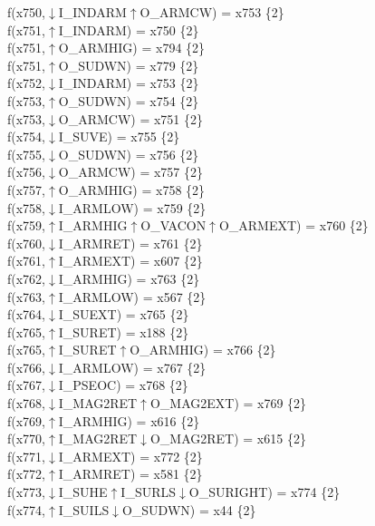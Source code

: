 f(x750,$\downarrow$I\_INDARM$\uparrow$O\_ARMCW) = x753 \{2\} \\  
f(x751,$\uparrow$I\_INDARM) = x750 \{2\} \\  
f(x751,$\uparrow$O\_ARMHIG) = x794 \{2\} \\  
f(x751,$\uparrow$O\_SUDWN) = x779 \{2\} \\  
f(x752,$\downarrow$I\_INDARM) = x753 \{2\} \\  
f(x753,$\uparrow$O\_SUDWN) = x754 \{2\} \\  
f(x753,$\downarrow$O\_ARMCW) = x751 \{2\} \\  
f(x754,$\downarrow$I\_SUVE) = x755 \{2\} \\  
f(x755,$\downarrow$O\_SUDWN) = x756 \{2\} \\  
f(x756,$\downarrow$O\_ARMCW) = x757 \{2\} \\  
f(x757,$\uparrow$O\_ARMHIG) = x758 \{2\} \\  
f(x758,$\downarrow$I\_ARMLOW) = x759 \{2\} \\  
f(x759,$\uparrow$I\_ARMHIG$\uparrow$O\_VACON$\uparrow$O\_ARMEXT) = x760 \{2\} \\  
f(x760,$\downarrow$I\_ARMRET) = x761 \{2\} \\  
f(x761,$\uparrow$I\_ARMEXT) = x607 \{2\} \\  
f(x762,$\downarrow$I\_ARMHIG) = x763 \{2\} \\  
f(x763,$\uparrow$I\_ARMLOW) = x567 \{2\} \\  
f(x764,$\downarrow$I\_SUEXT) = x765 \{2\} \\  
f(x765,$\uparrow$I\_SURET) = x188 \{2\} \\  
f(x765,$\uparrow$I\_SURET$\uparrow$O\_ARMHIG) = x766 \{2\} \\  
f(x766,$\downarrow$I\_ARMLOW) = x767 \{2\} \\  
f(x767,$\downarrow$I\_PSEOC) = x768 \{2\} \\  
f(x768,$\downarrow$I\_MAG2RET$\uparrow$O\_MAG2EXT) = x769 \{2\} \\  
f(x769,$\uparrow$I\_ARMHIG) = x616 \{2\} \\  
f(x770,$\uparrow$I\_MAG2RET$\downarrow$O\_MAG2RET) = x615 \{2\} \\  
f(x771,$\downarrow$I\_ARMEXT) = x772 \{2\} \\  
f(x772,$\uparrow$I\_ARMRET) = x581 \{2\} \\  
f(x773,$\downarrow$I\_SUHE$\uparrow$I\_SURLS$\downarrow$O\_SURIGHT) = x774 \{2\} \\  
f(x774,$\uparrow$I\_SUILS$\downarrow$O\_SUDWN) = x44 \{2\} \\  

